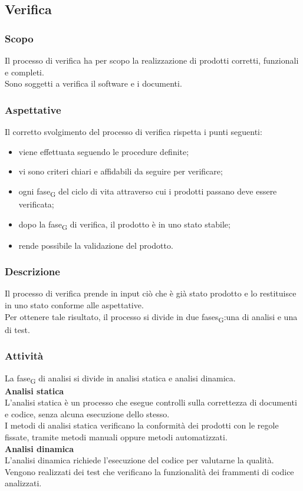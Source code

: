 \subsection{Verifica} 
    \label{verifica}
    \subsubsection{Scopo}
    Il processo di verifica ha per scopo la realizzazione di prodotti corretti, funzionali e completi.\\Sono soggetti a verifica il software e i documenti.
    \subsubsection{Aspettative}
    Il corretto svolgimento del processo di verifica rispetta i punti seguenti:
    \begin{itemize}
    	\item viene effettuata seguendo le procedure definite;
    	\item vi sono criteri chiari e affidabili da seguire per verificare;
    	\item ogni \gls{fase}\textsubscript{G} del ciclo di vita attraverso cui i prodotti passano deve essere verificata;
    	\item dopo la \gls{fase}\textsubscript{G} di  verifica, il prodotto è in uno stato stabile;
    	\item rende possibile la validazione del prodotto.
    \end{itemize}
    \subsubsection{Descrizione}
    Il processo di verifica prende in input ciò che è già stato prodotto e lo restituisce in uno stato conforme alle aspettative.\\Per ottenere tale risultato, il processo si divide in due \glspl{fase}\textsubscript{G}:una di analisi e una di test.
    \subsubsection{Attività}
    La \gls{fase}\textsubscript{G} di analisi si divide in analisi statica e analisi dinamica.\\
    \textbf{Analisi statica}\\
    L'analisi statica è un processo che esegue controlli sulla correttezza di documenti e codice, senza alcuna esecuzione dello stesso.\\I metodi di analisi statica verificano la conformità dei prodotti con le regole fissate, tramite metodi manuali oppure metodi automatizzati.\\ 
    \textbf{Analisi dinamica}\\
    L'analisi dinamica richiede l'esecuzione del codice per valutarne la qualità.\\Vengono realizzati dei test  che verificano la funzionalità dei frammenti di codice analizzati.
    
